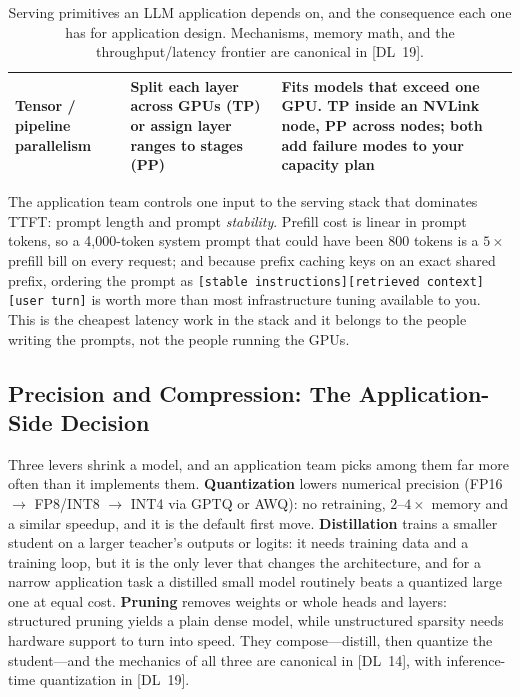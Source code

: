 \begin{table}[H]
\begin{tabularx}{\textwidth}{@{}l X X@{}}
Tensor / pipeline parallelism & Split each layer across GPUs (TP) or assign layer ranges to stages (PP) & Fits models that exceed one GPU. TP inside an NVLink node, PP across nodes; both add failure modes to your capacity plan \\
\bottomrule
\end{tabularx}
\caption{Serving primitives an LLM application depends on, and the consequence
each one has for application design.  Mechanisms, memory math, and the
throughput/latency frontier are canonical in [DL~19].}
\label{tab:parallelism}
\end{table}

\begin{keyinsight}
The application team controls one input to the serving stack that dominates
TTFT: prompt length and prompt \emph{stability}.  Prefill cost is linear in
prompt tokens, so a 4,000-token system prompt that could have been 800 tokens
is a $5\times$ prefill bill on every request; and because prefix caching keys
on an exact shared prefix, ordering the prompt as
\texttt{[stable instructions][retrieved context][user turn]} is worth more
than most infrastructure tuning available to you.  This is the cheapest
latency work in the stack and it belongs to the people writing the prompts,
not the people running the GPUs.
\end{keyinsight}

\subsection{Precision and Compression: The Application-Side Decision}
\label{sec:quantization}
\label{sec:distillation}
\label{sec:efficiency}

Three levers shrink a model, and an application team picks among them far more
often than it implements them.  \textbf{Quantization} lowers numerical
precision (FP16 $\to$ FP8/INT8 $\to$ INT4 via GPTQ or AWQ): no retraining,
$2$--$4\times$ memory and a similar speedup, and it is the default first move.
\textbf{Distillation} trains a smaller student on a larger teacher's outputs
or logits: it needs training data and a training loop, but it is the only
lever that changes the architecture, and for a narrow application task a
distilled small model routinely beats a quantized large one at equal cost.
\textbf{Pruning} removes weights or whole heads and layers: structured
pruning yields a plain dense model, while unstructured sparsity needs
hardware support to turn into speed.  They compose---distill, then quantize
the student---and the mechanics of all three are canonical in [DL~14], with
inference-time quantization in [DL~19].

